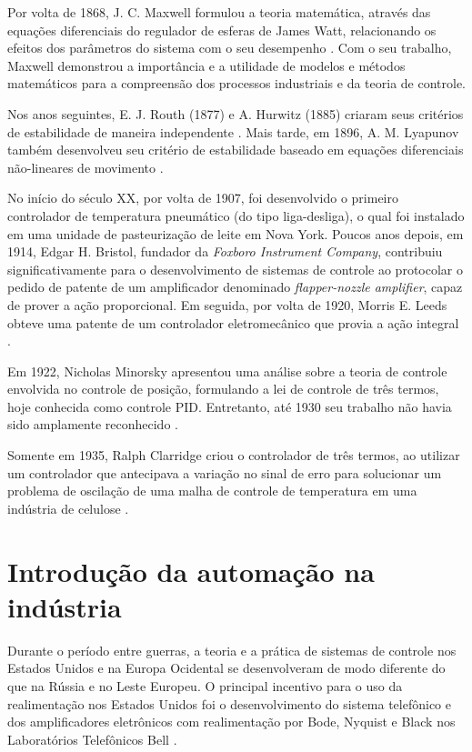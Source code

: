 Por volta de 1868, J. C. Maxwell formulou a teoria matemática, através das
equações diferenciais do regulador de esferas de James Watt, relacionando os
efeitos dos parâmetros do sistema com o seu desempenho \cite{maxwell:1964}. Com
o seu trabalho, Maxwell demonstrou a importância e a utilidade de modelos e
métodos matemáticos para a compreensão dos processos industriais e da teoria de
controle.

Nos anos seguintes, E. J. Routh (1877) e A. Hurwitz (1885) criaram seus
critérios de estabilidade de maneira independente
\cite{routh:1877,bennett:1996}. Mais tarde, em 1896, A. M. Lyapunov também
desenvolveu seu critério de estabilidade baseado em equações diferenciais
não-lineares de movimento \cite{faccin:2004}.

No início do século XX, por volta de 1907, foi desenvolvido o primeiro
controlador de temperatura pneumático (do tipo liga-desliga), o qual foi
instalado em uma unidade de pasteurização de leite em Nova York. Poucos anos
depois, em 1914, Edgar H. Bristol, fundador da {\it Foxboro Instrument Company},
contribuiu significativamente para o desenvolvimento de sistemas de controle ao
protocolar o pedido de patente de um amplificador denominado {\it flapper-nozzle
amplifier}, capaz de prover a ação proporcional. Em seguida, por volta de 1920,
Morris E. Leeds obteve uma patente de um controlador eletromecânico que provia a
ação integral \cite{faccin:2004}.

Em 1922, Nicholas Minorsky apresentou uma análise sobre a teoria de controle
envolvida no controle de posição, formulando a lei de controle de três termos,
hoje conhecida como controle PID.  Entretanto, até 1930 seu trabalho não havia
sido amplamente reconhecido \cite{bennett:1996}.

Somente em 1935, Ralph Clarridge criou o controlador de três termos, ao utilizar
um controlador que antecipava a variação no sinal de erro para solucionar um
problema de oscilação de uma malha de controle de temperatura em uma indústria
de celulose \cite{faccin:2004}.

\section{Introdução da automação na indústria}
Durante o período entre guerras, a teoria e a prática de sistemas de controle
nos Estados Unidos e na Europa Ocidental se desenvolveram de modo diferente do
que na Rússia e no Leste Europeu. O principal incentivo para o uso da
realimentação nos Estados Unidos foi o desenvolvimento do sistema telefônico e
dos amplificadores eletrônicos com realimentação por Bode, Nyquist e Black nos
Laboratórios Telefônicos Bell \cite{dorf:2009}.

